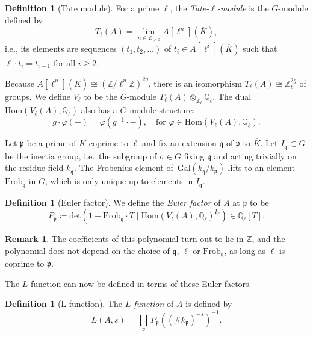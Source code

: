 \documentclass[12pt]{article}
\theoremstyle{definition}
\newtheorem{definition}[theorem]{Definition}
\newtheorem{remark}[theorem]{Remark}
\numberwithin{equation}{subsection}
\newcommand{\Q}{\ensuremath{\mathbb{Q}}}
\newcommand{\Z}{\ensuremath{\mathbb{Z}}}
\newcommand{\Hom}{\textrm{Hom}}
\begin{document}
\begin{definition}[Tate module]
For a prime $\ell$, the {\em Tate-$\ell$-module} is the $G$-module defined by
$$T_{\ell}(A) = \lim_{n \in \Z_{>0}} A[\ell^n](\overline{K}),$$
i.e., its elements are sequences $(t_1, t_2, \ldots)$ of $t_i \in A[\ell^i](\overline{K})$ such that $\ell \cdot t_i = t_{i-1}$ for all $i \geq 2$.
\end{definition}

Because $A[\ell^n](\overline{K}) \cong (\Z/\ell^n\Z)^{2g}$, there is an isomorphism $T_\ell(A) \cong \Z_{\ell}^{2g}$ of groups.
We define $V_{\ell}$ to be the $G$-module $T_{\ell}(A) \otimes _{\Z_\ell} \Q_\ell$.
The dual $\Hom(V_{\ell}(A), \Q_\ell)$ also has a $G$-module structure:
$$g \cdot \varphi(-) = \varphi(g^{-1} \cdot -), \quad \textrm{for } \varphi \in \Hom(V_{\ell}(A), \Q_{\ell}).$$

Let $\mathfrak{p}$ be a prime of $K$ coprime to $\ell$ and fix an extension $\mathfrak{q}$ of $\mathfrak{p}$ to $\overline{K}$.
Let $I_\mathfrak{q} \subset G$ be the inertia group, i.e.\ the subgroup of $\sigma \in G$ fixing $\mathfrak{q}$ and acting trivially on the residue field $k_\mathfrak{q}$.
The Frobenius element of~$\mathrm{Gal}(k_\mathfrak{q} / k_\mathfrak{p})$ lifts to an element $\mathrm{Frob}_\mathfrak{q}$ in $G$, which is only unique up to elements in $I_\mathfrak{q}$.

\begin{definition}[Euler factor]
We define the {\em Euler factor} of $A$ at $\mathfrak{p}$ to be
$$P_\mathfrak{p} \coloneqq \mathrm{det}\!\left( 1 - \mathrm{Frob}_\mathfrak{q} \cdot T \mid \mathrm{Hom}( V_\ell(A), \Q_\ell)^{I_v}\right) \in \Q_\ell[T].$$
\end{definition}

\begin{remark}
The coefficients of this polynomial turn out to lie in $\Z$, and the polynomial does not depend on the choice of $\mathfrak{q}$, $\ell$ or $\mathrm{Frob}_\mathfrak{q}$, as long as $\ell$ is coprime to $\mathfrak{p}$.
\end{remark}

The $L$-function can now be defined in terms of these Euler factors.

\begin{definition}[L-function]
The {\em $L$-function} of $A$ is defined by
$$L(A, s) = \prod_{\mathfrak{p}} P_\mathfrak{p}\!\left( (\# k_\mathfrak{p})^{-s}\right)^{-1}.$$
\end{definition}
\end{document}
